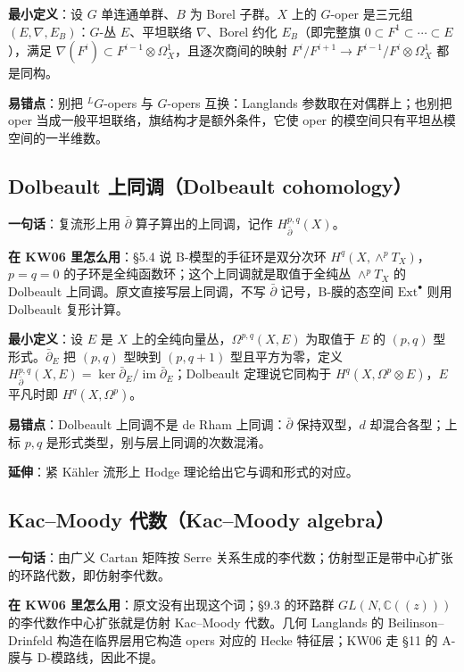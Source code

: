 \textbf{最小定义}：设 $G$ 单连通单群、$B$ 为 Borel 子群。$X$ 上的 $G$-oper 是三元组 $(E,\nabla,E_B)$：$G$-丛 $E$、平坦联络 $\nabla$、Borel 约化 $E_B$（即完整旗 $0\subset F^1\subset\cdots\subset E$），满足 $\nabla(F^i)\subset F^{i-1}\otimes\Omega_X^1$，且逐次商间的映射 $F^i/F^{i+1}\to F^{i-1}/F^i\otimes\Omega_X^1$ 都是同构。

\textbf{易错点}：别把 ${}^L G$-opers 与 $G$-opers 互换：Langlands 参数取在对偶群上；也别把 oper 当成一般平坦联络，旗结构才是额外条件，它使 oper 的模空间只有平坦丛模空间的一半维数。

\subsection{Dolbeault 上同调（Dolbeault cohomology）}

\textbf{一句话}：复流形上用 $\bar\partial$ 算子算出的上同调，记作 $H^{p,q}_{\bar\partial}(X)$。

\textbf{在 KW06 里怎么用}：§5.4 说 B-模型的手征环是双分次环 $H^q(X,\wedge^pT_X)$，$p=q=0$ 的子环是全纯函数环；这个上同调就是取值于全纯丛 $\wedge^pT_X$ 的 Dolbeault 上同调。原文直接写层上同调，不写 $\bar\partial$ 记号，B-膜的态空间 $\mathrm{Ext}^\bullet$ 则用 Dolbeault 复形计算。

\textbf{最小定义}：设 $E$ 是 $X$ 上的全纯向量丛，$\Omega^{p,q}(X,E)$ 为取值于 $E$ 的 $(p,q)$ 型形式。$\bar\partial_E$ 把 $(p,q)$ 型映到 $(p,q+1)$ 型且平方为零，定义 $H^{p,q}_{\bar\partial}(X,E)=\ker\bar\partial_E/\operatorname{im}\bar\partial_E$；Dolbeault 定理说它同构于 $H^q(X,\Omega^p\otimes E)$，$E$ 平凡时即 $H^q(X,\Omega^p)$。

\textbf{易错点}：Dolbeault 上同调不是 de Rham 上同调：$\bar\partial$ 保持双型，$d$ 却混合各型；上标 $p,q$ 是形式类型，别与层上同调的次数混淆。

\textbf{延伸}：紧 Kähler 流形上 Hodge 理论给出它与调和形式的对应。

\subsection{Kac--Moody 代数（Kac--Moody algebra）}

\textbf{一句话}：由广义 Cartan 矩阵按 Serre 关系生成的李代数；仿射型正是带中心扩张的环路代数，即仿射李代数。

\textbf{在 KW06 里怎么用}：原文没有出现这个词；§9.3 的环路群 $GL(N,\mathbb C(\!(z)\!))$ 的李代数作中心扩张就是仿射 Kac--Moody 代数。几何 Langlands 的 Beilinson--Drinfeld 构造在临界层用它构造 opers 对应的 Hecke 特征层；KW06 走 §11 的 A-膜与 D-模路线，因此不提。

